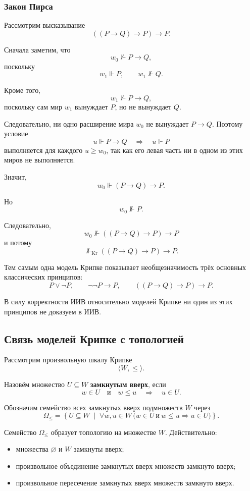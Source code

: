 \documentclass[12pt,a4paper,oneside,openany]{book}
\theoremstyle{definition}
\theoremstyle{plain}
\theoremstyle{remark}
\begin{document}
\subsubsection{Закон Пирса}

Рассмотрим высказывание
\[
((P\to Q)\to P)\to P.
\]

Сначала заметим, что
\[
w_0\nVdash P\to Q,
\]
поскольку
\[
w_1\Vdash P,
\qquad
w_1\nVdash Q.
\]

Кроме того,
\[
w_1\nVdash P\to Q,
\]
поскольку сам мир \(w_1\) вынуждает \(P\), но не вынуждает \(Q\).

Следовательно, ни одно расширение мира \(w_0\) не вынуждает
\(P\to Q\). Поэтому условие
\[
u\Vdash P\to Q
\quad\Longrightarrow\quad
u\Vdash P
\]
выполняется для каждого \(u\geqslant w_0\), так как его левая часть
ни в одном из этих миров не выполняется.

Значит,
\[
w_0\Vdash(P\to Q)\to P.
\]

Но
\[
w_0\nVdash P.
\]

Следовательно,
\[
w_0\nVdash((P\to Q)\to P)\to P
\]
и потому
\[
\nVdash_{\mathrm{Kr}}
((P\to Q)\to P)\to P.
\]

Тем самым одна модель Крипке показывает необщезначимость трёх
основных классических принципов:
\[
P\lor\neg P,
\qquad
\neg\neg P\to P,
\qquad
((P\to Q)\to P)\to P.
\]

В силу корректности ИИВ относительно моделей Крипке ни один из этих
принципов не доказуем в ИИВ.

\subsection{Связь моделей Крипке с топологией}

Рассмотрим произвольную шкалу Крипке
\[
\langle W,\leqslant\rangle.
\]

Назовём множество \(U\subseteq W\) \textbf{замкнутым вверх}, если
\[
w\in U
\quad\text{и}\quad
w\leqslant u
\quad\Longrightarrow\quad
u\in U.
\]

Обозначим семейство всех замкнутых вверх подмножеств \(W\) через
\[
\Omega_{\leqslant}
=
\left\{
U\subseteq W
\;\middle|\;
\forall w,u\in W\,
\bigl(
w\in U\ \text{и}\ w\leqslant u
\Longrightarrow
u\in U
\bigr)
\right\}.
\]

Семейство \(\Omega_{\leqslant}\) образует топологию на множестве
\(W\). Действительно:

\begin{itemize}
    \item множества \(\varnothing\) и \(W\) замкнуты вверх;
    \item произвольное объединение замкнутых вверх множеств замкнуто
          вверх;
    \item произвольное пересечение замкнутых вверх множеств замкнуто
          вверх.
\end{itemize}
\end{document}
